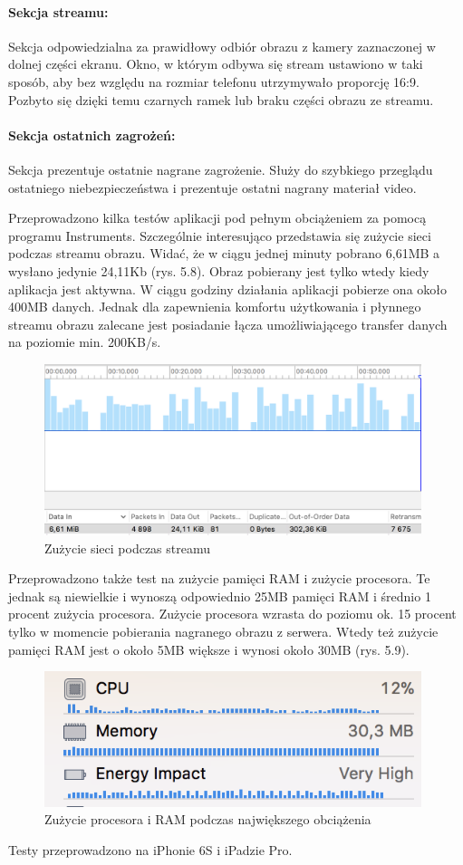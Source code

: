 \paragraph{Sekcja streamu:}
Sekcja odpowiedzialna za prawidłowy odbiór obrazu z kamery zaznaczonej w dolnej części ekranu. Okno, w którym odbywa się stream ustawiono w taki sposób, aby bez względu na rozmiar telefonu utrzymywało proporcję 16:9. Pozbyto się dzięki temu czarnych ramek lub braku części obrazu ze streamu.
\paragraph{Sekcja ostatnich zagrożeń:}
Sekcja prezentuje ostatnie nagrane zagrożenie. Służy do szybkiego przeglądu ostatniego niebezpieczeństwa i prezentuje ostatni nagrany materiał video. 

Przeprowadzono kilka testów aplikacji pod pełnym obciążeniem za pomocą programu Instruments. Szczególnie interesująco przedstawia się zużycie sieci podczas streamu obrazu. Widać, że w ciągu jednej minuty pobrano 6,61MB a wysłano jedynie 24,11Kb (rys. 5.8). Obraz pobierany jest tylko wtedy kiedy aplikacja jest aktywna. W ciągu godziny działania aplikacji pobierze ona około 400MB danych. Jednak dla zapewnienia komfortu użytkowania i płynnego streamu obrazu zalecane jest posiadanie łącza umożliwiającego transfer danych na poziomie min. 200KB/s. 
\begin{figure}[ht]
	\centering
	\includegraphics[width=11cm]{networkUsage}
	\caption{Zużycie sieci podczas streamu}
\end{figure}
Przeprowadzono także test na zużycie pamięci RAM i zużycie procesora. Te jednak są niewielkie i wynoszą odpowiednio 25MB pamięci RAM i średnio 1 procent zużycia procesora.
Zużycie procesora wzrasta do poziomu ok. 15 procent tylko w momencie pobierania nagranego obrazu z serwera. Wtedy też zużycie pamięci RAM jest o około 5MB większe i wynosi około 30MB (rys. 5.9).
\begin{figure}[ht]
	\centering
	\includegraphics[width=11cm]{CPURAM}
	\caption{Zużycie procesora i RAM podczas największego obciążenia}
\end{figure}
Testy przeprowadzono na iPhonie 6S i iPadzie Pro.



